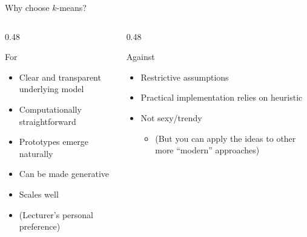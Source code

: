 \documentclass[aspectratio=169]{beamer}
\begin{document}
\begin{frame}{Why choose $k$-means?}
  \begin{columns}[T]
    \begin{column}{0.48\textwidth}
      \begin{block}{For}
        \begin{itemize}
          \item Clear and transparent underlying model
          \item Computationally straightforward
          \item Prototypes emerge naturally
          \item Can be made generative
          \item Scales well
          \item (Lecturer's personal preference)
        \end{itemize}
      \end{block}
    \end{column}
    \pause
    \begin{column}{0.48\textwidth}
      \begin{block}{Against}
        \begin{itemize}
          \item Restrictive assumptions
          \item Practical implementation relies on heuristic
          \item Not sexy/trendy
          \begin{itemize}
            \item (But you can apply the ideas to other more ``modern''  approaches)
          \end{itemize}
        \end{itemize}
      \end{block}
    \end{column}
  \end{columns}
\end{frame}
\end{document}

